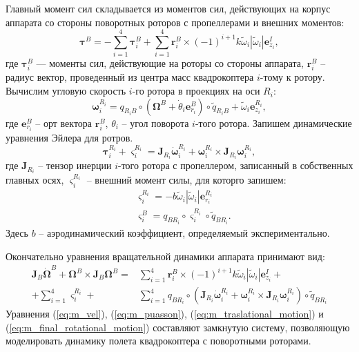 Главный момент сил складывается из моментов сил, действующих на корпус аппарата со стороны поворотных роторов с пропеллерами и внешних моментов:
\begin{equation} \label{eq:m_general_torq}
\bm{\tau}^{B} =
-\sum_{i=1}^{4} {\bm{\tau}^{B}_i} +
\sum_{i=1}^{4} {\bm{r}^B_i \times (-1)^{i+1} k \tilde \omega_i |\tilde \omega_i| \bm{e}^I_{z_i},}
\end{equation}
где $\bm{\tau}^{B}_i$ — моменты сил, действующие на роторы со стороны аппарата, $\bm{r}^B_i$ -- радиус вектор, проведенный из центра масс квадрокоптера $i$-тому к ротору. Вычислим угловую скорость $i$-го ротора в проекциях на оси $R_i$:
\begin{equation} \label{eq:m_prop_ang_vel}
\bm{\omega}^{R_i}_i =
q_{{R_i} B} \circ (\bm{\Omega}^B + \dot {\theta}_i \bm e^B_{r_i}) \circ \tilde {q}_{{R_i}B} +
\tilde \omega_i \bm{e}^{R_i}_{z_i},
\end{equation}
где $\bm e^B_{r_i}$ -- орт вектора $\bm{r}^B_i$, ${\theta}_i$ -- угол поворота $i$-того ротора. Запишем динамические уравнения Эйлера для ротров.
\begin{equation} \label{eq:m_rotors_dyn}
\bm{\tau}^{{R_i}}_i + \bm{\varsigma}^{{R_i}}_{i} = 
\bm{J}_{R_i}\dot{\bm{\omega}}^{R_i}_i + \bm{\omega}^{R_i}_i \times \bm{J}_{R_i}{\bm{\omega}^{R_i}_i},
\end{equation}
где $\bm{J}_{R_i}$ -- тензор инерции $i$-того ротора с пропеллером, записанный в собственных главных осях, $\bm{\varsigma}^{{R_i}}_{i}$ -- внешний момент силы, для которго запишем:
\begin{equation} \label{eq:m_ext_torq}
\begin{aligned}
&\bm{\varsigma}^{{R_i}}_{i} = -b \tilde \omega_i |\tilde \omega_i| \bm e^{R_i}_{r_i}\\
&\bm{\varsigma}^{B}_{i} = q_{ B {R_i}} \circ \bm{\varsigma}^{{R_i}}_{i} \circ \tilde q_{ B {R_i}}.
\end{aligned}
\end{equation}
Здесь $b$ -- аэродинамический коэффициент, определяемый экспериментально.

Окончательно уравнения вращательной динамики аппарата принимают вид:
\begin{equation} \label{eq:m_final_rotational_motion}
\begin{aligned}
\bm{J}_B\dot{\bm{\Omega}}^B + \bm{\Omega}^B \times \bm{J}_B{\bm{\Omega}^B} =
&\sum_{i=1}^{4} {\bm{r}^B_i \times
	(-1)^{i+1} k \tilde \omega_i |\tilde \omega_i| \bm{e}^I_{z_i}} + \\ +
\sum_{i=1}^{4} {\bm{\varsigma}^{{R_i}}_{i}} +
&\sum_{i=1}^{4} q_{ B {R_i}} \circ (\bm{J}_{R_i}\dot{\bm{\omega}}^{R_i}_i + \bm{\omega}^{R_i}_i \times \bm{J}_{R_i}{\bm{\omega}^{R_i}_i}) \circ \tilde q_{ B {R_i}}
\end{aligned}
\end{equation}
Уравнения (\ref{eq:m_vel}), (\ref{eq:m_puasson}), (\ref{eq:m_traslational_motion}) и (\ref{eq:m_final_rotational_motion}) составляют замкнутую систему, позволяющую моделировать динамику полета квадрокоптера с поворотными роторами.

